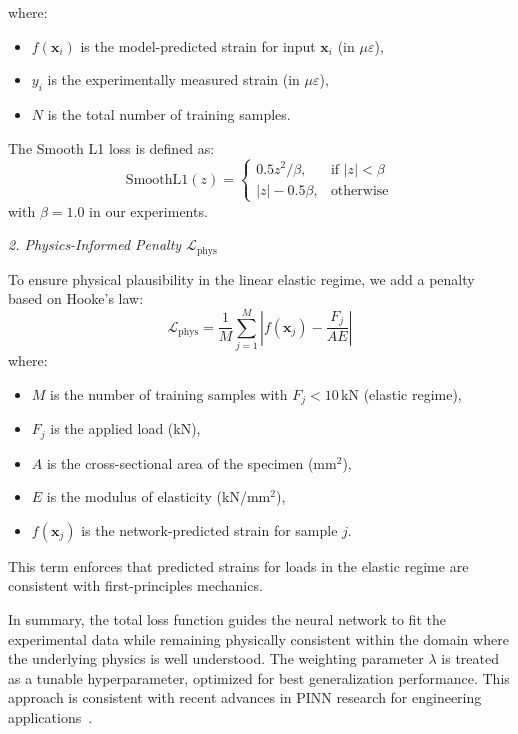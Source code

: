 \documentclass{article}
\begin{document}
where:
\begin{itemize}
  \item $f(\mathbf{x}_i)$ is the model-predicted strain for input $\mathbf{x}_i$ (in $\mu\varepsilon$),
  \item $y_i$ is the experimentally measured strain (in $\mu\varepsilon$),
  \item $N$ is the total number of training samples.
\end{itemize}
The Smooth L1 loss is defined as:
\begin{equation}
\mathrm{SmoothL1}(z) =
\begin{cases}
0.5 z^2 / \beta, & \text{if } |z| < \beta \\
|z| - 0.5\beta, & \text{otherwise}
\end{cases}
\end{equation}
with $\beta = 1.0$ in our experiments.

\vspace{1em}
\noindent
\emph{2. Physics-Informed Penalty $\mathcal{L}_{\mathrm{phys}}$}

To ensure physical plausibility in the linear elastic regime, we add a penalty based on Hooke’s law:
\begin{equation}
\mathcal{L}_{\mathrm{phys}} = \frac{1}{M} \sum_{j=1}^{M} \left| f(\mathbf{x}_j) - \frac{F_j}{A E} \right|
\end{equation}
where:
\begin{itemize}
    \item $M$ is the number of training samples with $F_j < 10$\,kN (elastic regime),
    \item $F_j$ is the applied load (kN),
    \item $A$ is the cross-sectional area of the specimen (mm$^2$),
    \item $E$ is the modulus of elasticity (kN/mm$^2$),
    \item $f(\mathbf{x}_j)$ is the network-predicted strain for sample $j$.
\end{itemize}
This term enforces that predicted strains for loads in the elastic regime are consistent with first-principles mechanics.

\vspace{1em}
\noindent
In summary, the total loss function guides the neural network to fit the experimental data while remaining physically consistent within the domain where the underlying physics is well understood. The weighting parameter $\lambda$ is treated as a tunable hyperparameter, optimized for best generalization performance. This approach is consistent with recent advances in PINN research for engineering applications~\cite{raissi2019physics, han2025msc, fan2023pinn}.
\end{document}
